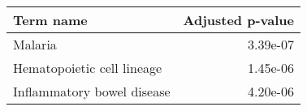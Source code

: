 \begin{tabular}{lr}
\toprule
                 Term name &  Adjusted p-value \\
\midrule
                   Malaria &          3.39e-07 \\
Hematopoietic cell lineage &          1.45e-06 \\
Inflammatory bowel disease &          4.20e-06 \\
\bottomrule
\end{tabular}
